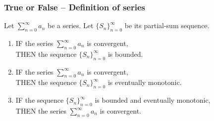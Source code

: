 \begin{frame}[t]
	\fontsize{12}{12}\selectfont
	\frametitle{True or False -- Definition of series}

	Let $\displaystyle \sum_{n=0}^{\infty}a_{n}$ be a series. Let
	$\displaystyle \{ S_{n}\}_{n=0}^{\infty}$ be its partial-sum sequence.

	\begin{enumerate}
		\item IF {\color{blue} the series $\displaystyle \sum_{n=0}^{\infty}a_{n}$ is convergent},
			\\ THEN
			{\color{red} the sequence $\displaystyle \{ S_{n}\}_{n=0}^{\infty}$ is bounded}.
			\vspace{.5cm}

		\item IF {\color{blue} the series $\displaystyle \sum_{n=0}^{\infty}a_{n}$ is convergent},
			\\ THEN
			{\color{red} the sequence $\displaystyle \{ S_{n}\}_{n=0}^{\infty}$ is eventually monotonic}.
			\vspace{.8cm}

		\item IF {\color{red} the sequence $\displaystyle \{ S_{n}\}_{n=0}^{\infty}$ is bounded and eventually monotonic},
			\\ THEN
			{\color{blue} the series $\displaystyle \sum_{n=0}^{\infty}a_{n}$ is convergent}.
	\end{enumerate}
\end{frame}

